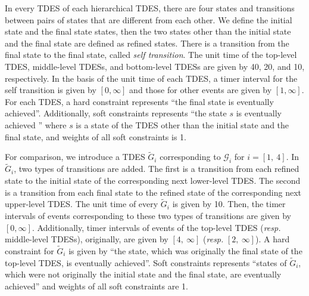 \documentclass[journal,twoside,web]{IEEEtran}
\begin{document}
In every TDES of each hierarchical TDES, there are four states and transitions between pairs of states that are different from each other.
We define the initial state and the final state states, then the two states other than the initial state and the final state are defined as refined states.
There is a transition from the final state to the final state, called \textit{self transition}.
The unit time of the top-level TDES, middle-level TDESs, and bottom-level TDESs are given by 40, 20, and 10, respectively.
In the basis of the unit time of each TDES, a timer interval for the  self transition is given by $[0,\infty]$ and those for other events are given by $[1,\infty]$.
For each TDES, a hard constraint represents ``the final state  is eventually achieved''.
Additionally, soft constraints represents ``the state $s$ is eventually achieved '' where $s$ is a state of the TDES other than the initial state and the final state, and weights of all soft constraints is 1.

For comparison, we introduce a TDES $\tilde{G}_i$ corresponding to $\mathcal{G}_i$ for $i=[1,~4]$.
In $\tilde{G}_i$, two types of transitions are added.
The first is a transition from each refined state to  the initial state of the corresponding next lower-level TDES. 
The second is a transition from each final state to the refined state of the corresponding next upper-level TDES.
The unit time of every $\tilde{G}_i$ is given by 10.
Then, the timer intervals of events corresponding to these two types of transitions are given by $[0,\infty]$.
Additionally, timer intervals of events of the top-level TDES ({\sl resp.} middle-level TDESs), originally, are given by $[4,~\infty]$ ({\sl resp.} $[2,~\infty]$).
A hard constraint for $\tilde{G}_i$ is given by ``the state, which was originally the final state of the top-level TDES, is eventually achieved''.
Soft constraints represents ``states of $\tilde{G}_i$, which were not originally the initial state and the final state, are eventually achieved'' and weights of all soft constraints are 1.
\end{document}
